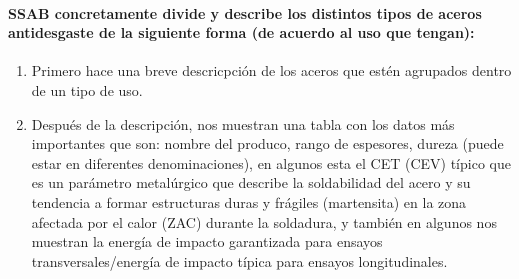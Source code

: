 \documentclass[12pt,a4paper]{article}
\begin{document}
\paragraph{SSAB concretamente divide y describe los distintos tipos de aceros antidesgaste de la siguiente forma (de acuerdo al uso que tengan):}

\begin{enumerate}
    \item Primero hace una breve descricpción de los aceros que estén agrupados dentro de un tipo de uso.
    \item Después de la descripción, nos muestran una tabla con los datos más importantes que son: nombre del produco, rango de espesores, dureza (puede estar en diferentes denominaciones), en algunos esta el CET (CEV) típico que es un parámetro metalúrgico que describe la soldabilidad del acero y su tendencia a formar estructuras duras y frágiles (martensita) en la zona afectada por el calor (ZAC) durante la soldadura, y también en algunos nos muestran la energía de impacto garantizada para ensayos transversales/energía de impacto típica para ensayos longitudinales.
\end{enumerate}
\end{document}
